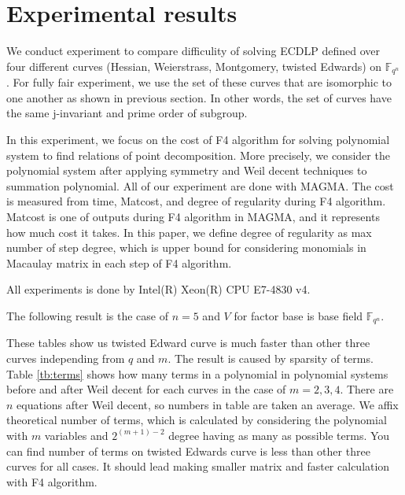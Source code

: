 \section{Experimental results}
\label{sec:experiment}

We conduct experiment to compare difficulity of solving ECDLP 
defined over four different curves 
(Hessian, Weierstrass, Montgomery, twisted Edwards) on $\mathbb{F}_{q^n}$.
For fully fair experiment, we use the set of these curves 
that are isomorphic to one another as shown in previous section.
In other words, the set of curves have the same j-invariant 
and prime order of subgroup.

In this experiment, we focus on the cost of F4 algorithm for solving polynomial 
system to find relations of point decomposition.
More precisely, we consider the polynomial system 
after applying symmetry and Weil decent techniques to summation polynomial.
All of our experiment are done with MAGMA. 
The cost is measured from time, Matcost, and degree of regularity 
during F4 algorithm.
Matcost is one of outputs during F4 algorithm in MAGMA, 
and it represents how much cost it takes.
In this paper, we define degree of regularity as max number of step degree, 
which is upper bound for considering monomials in Macaulay matrix 
in each step of F4 algorithm.

All experiments is done by Intel(R) Xeon(R) CPU E7-4830 v4.


The following result is the case of $n=5$ and 
$V$ for factor base is base field $\mathbb{F}_{q^n}$.



These tables show us twisted Edward curve is much faster than 
other three curves independing from $q$ and $m$.
The result is caused by sparsity of terms.
Table \ref{tb:terms} shows how many terms in a polynomial in polynomial systems 
before and after Weil decent for each curves in the case of $m=2,3,4$.
There are $n$ equations after Weil decent, 
so numbers in table are taken an average. 
We affix theoretical number of terms, which is calculated by considering
the polynomial with $m$ variables and $2^{(m+1)-2}$ degree 
having as many as possible terms. 
You can find number of terms on twisted Edwards curve is less than 
other three curves for all cases.
It should lead making smaller matrix and faster calculation with F4 algorithm.




